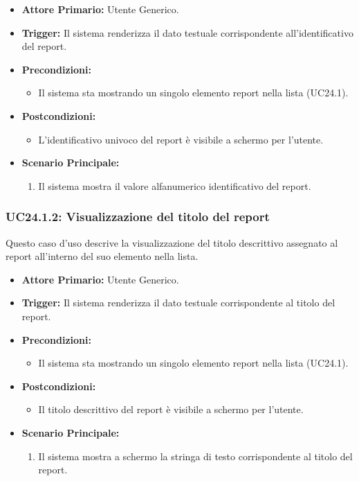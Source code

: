 \documentclass[12pt, a4paper]{article}
\begin{document}
\begin{itemize}
    \item \textbf{Attore Primario:} Utente Generico.
    \item \textbf{Trigger:} Il sistema renderizza il dato testuale corrispondente all'identificativo del report.
    \item \textbf{Precondizioni:}
    \begin{itemize}
        \item Il sistema sta mostrando un singolo elemento report nella lista (UC24.1).
    \end{itemize}
    \item \textbf{Postcondizioni:}
    \begin{itemize}
        \item L'identificativo univoco del report è visibile a schermo per l'utente.
    \end{itemize}
    \item \textbf{Scenario Principale:}
    \begin{enumerate}
        \item Il sistema mostra il valore alfanumerico identificativo del report.
    \end{enumerate}
\end{itemize}

\subsubsection{UC24.1.2: Visualizzazione del titolo del report}\label{uc:24.1.2}
Questo caso d'uso descrive la visualizzazione del titolo descrittivo assegnato al report all'interno del suo elemento nella lista.

\begin{itemize}
    \item \textbf{Attore Primario:} Utente Generico.
    \item \textbf{Trigger:} Il sistema renderizza il dato testuale corrispondente al titolo del report.
    \item \textbf{Precondizioni:}
    \begin{itemize}
        \item Il sistema sta mostrando un singolo elemento report nella lista (UC24.1).
    \end{itemize}
    \item \textbf{Postcondizioni:}
    \begin{itemize}
        \item Il titolo descrittivo del report è visibile a schermo per l'utente.
    \end{itemize}
    \item \textbf{Scenario Principale:}
    \begin{enumerate}
        \item Il sistema mostra a schermo la stringa di testo corrispondente al titolo del report.
    \end{enumerate}
\end{itemize}
\end{document}
